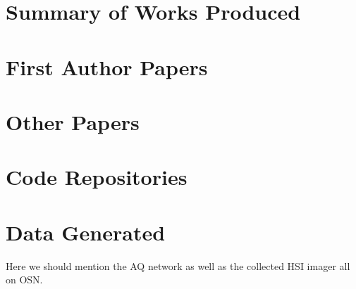 \section{Summary of Works Produced}

\section{First Author Papers}
\section{Other Papers}
\section{Code Repositories}
\section{Data Generated}
Here we should mention the AQ network as well as the collected HSI imager all on OSN.


